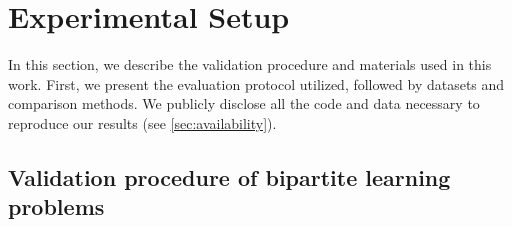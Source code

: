 \documentclass[sn-mathphys-num]{sn-jnl}%
\theoremstyle{thmstyleone}%
\theoremstyle{thmstyletwo}%
\theoremstyle{thmstylethree}%
\begin{document}
\section{Experimental Setup}
\label{sec:experimental setup}

In this section, we describe the validation procedure and materials used in this work. First, we present the evaluation protocol utilized, followed by datasets and comparison methods. We publicly disclose all the code and data necessary to reproduce our results (see \autoref{sec:availability}).


\subsection{Validation procedure of bipartite learning problems}
\label{sec:bipartite validation}

% 
\end{document}
